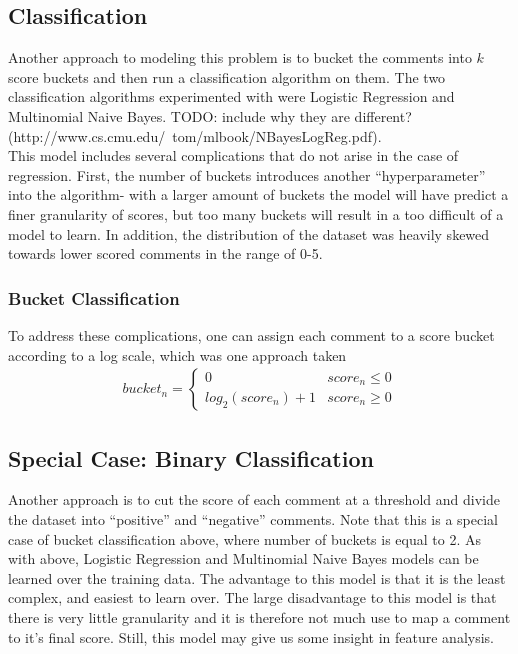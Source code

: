 \documentclass[11pt, twocolumn]{article}
\begin{document}
	\subsection{Classification}
		Another approach to modeling this problem is to bucket the comments into $k$ score buckets and then run a classification algorithm on them. The two classification algorithms experimented with were Logistic Regression and Multinomial Naive Bayes. TODO: include why they are different? (http://www.cs.cmu.edu/~tom/mlbook/NBayesLogReg.pdf).  \\
		This model includes several complications that do not arise in the case of regression. First, the number of buckets introduces another ``hyperparameter'' into the algorithm- with a larger amount of buckets the model will have predict a finer granularity of scores, but too many buckets will result in a too difficult of a model to learn. In addition, the distribution of the dataset was heavily skewed towards lower scored comments in the range of 0-5.
		
		\subsubsection{Bucket Classification}
		To address these complications, one can assign each comment to a score bucket according to a log scale, which was one approach taken
		\begin{gather*}
			bucket_n = \begin{cases}
				0 & score_n \le 0 \\
				log_2(score_n) + 1 & score_n \geq 0
				 \end{cases}
		\end{gather*}
	
	
		\subsection{Special Case: Binary Classification}
		Another approach is to cut the score of each comment at a threshold and divide the dataset into ``positive'' and ``negative'' comments. Note that this is a special case of bucket classification above, where number of buckets is equal to 2. As with above, Logistic Regression and Multinomial Naive Bayes models can be learned over the training data. The advantage to this model is that it is the least complex, and easiest to learn over. The large disadvantage to this model is that there is very little granularity and it is therefore not much use to map a comment to it's final score. Still, this model may give us some insight in feature analysis.
\end{document}
